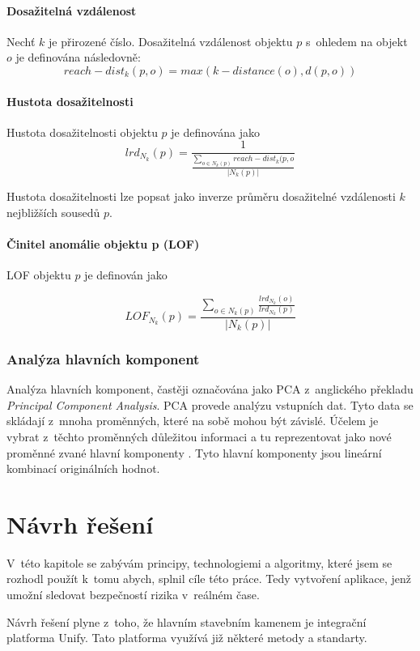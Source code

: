 \documentclass[thesis=M,czech]{FITthesis}[2012/10/20]
\begin{document}
			\subsubsection{Dosažitelná vzdálenost}
				Nechť $k$ je přirozené číslo. Dosažitelná vzdálenost objektu $p$ s~ohledem na objekt $o$ je definována následovně: 
				$$ reach-dist_k(p, o) = max (k-distance(o), d(p, o)) $$
				
			\subsubsection{Hustota dosažitelnosti}
				Hustota dosažitelnosti objektu $p$ je definována jako
				$$ lrd_{N_k}(p) = \frac{1}{ \frac{\sum_{o \in N_k(p)} reach-dist_k(p,o}{|N_k(p)|}} $$
				
				Hustota dosažitelnosti lze popsat jako inverze průměru dosažitelné vzdálenosti $k$ nejbližších sousedů $p$.
				
			\subsubsection{Činitel anomálie objektu p (LOF)}
				LOF objektu $p$ je definován jako 
				
				$$LOF_{N_k}(p) = \frac{\sum_{o \in N_k(p)} \frac{lrd_{N_k}(o)}{lrd_{N_k}(p)}}{|N_k(p)|} $$		
		
		\subsection{Analýza hlavních komponent}
		\label{sec:pca}
		Analýza hlavních komponent, častěji označována jako PCA z~anglického překladu \textit{Principal Component Analysis}. PCA provede analýzu vstupních dat. Tyto data se skládají z~mnoha proměnných, které na sobě mohou být závislé. Účelem je vybrat z~těchto proměnných důležitou informaci a tu reprezentovat jako nové proměnné zvané hlavní komponenty \cite{PCA_book}. Tyto hlavní komponenty jsou lineární kombinací originálních hodnot.
		
	

\chapter{Návrh řešení}
	V~této kapitole se zabývám principy, technologiemi a algoritmy, které jsem se rozhodl použít k~tomu abych, splnil cíle této práce. Tedy vytvoření aplikace, jenž umožní sledovat bezpečností rizika v~reálném čase.
	
	Návrh řešení plyne z~toho, že hlavním stavebním kamenem je integrační platforma Unify. Tato platforma využívá již některé metody a standarty. 
	
\end{document}
